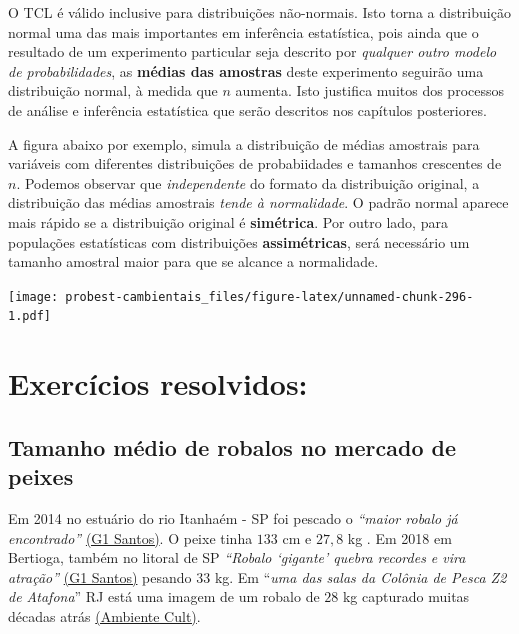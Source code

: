 \documentclass[
]{book}
\begin{document}
O TCL é válido inclusive para distribuições não-normais. Isto torna a distribuição normal uma das mais importantes em inferência estatística, pois ainda que o resultado de um experimento particular seja descrito por \emph{qualquer outro modelo de probabilidades}, as \textbf{médias das amostras} deste experimento seguirão uma distribuição normal, à medida que \(n\) aumenta. Isto justifica muitos dos processos de análise e inferência estatística que serão descritos nos capítulos posteriores.

A figura abaixo por exemplo, simula a distribuição de médias amostrais para variáveis com diferentes distribuições de probabiidades e tamanhos crescentes de \(n\). Podemos observar que \emph{independente} do formato da distribuição original, a distribuição das médias amostrais \emph{tende à normalidade}. O padrão normal aparece mais rápido se a distribuição original é \textbf{simétrica}. Por outro lado, para populações estatísticas com distribuições \textbf{assimétricas}, será necessário um tamanho amostral maior para que se alcance a normalidade.

\texttt{[image: probest-cambientais\_files/figure-latex/unnamed-chunk-296-1.pdf]}

\hypertarget{exercuxedcios-resolvidos-1}{%
\section{Exercícios resolvidos:}\label{exercuxedcios-resolvidos-1}}

\hypertarget{tamanho-muxe9dio-de-robalos-no-mercado-de-peixes}{%
\subsection{Tamanho médio de robalos no mercado de peixes}\label{tamanho-muxe9dio-de-robalos-no-mercado-de-peixes}}

Em 2014 no estuário do rio Itanhaém - SP foi pescado o \emph{``maior robalo já encontrado''} \href{http://g1.globo.com/sp/santos-regiao/noticia/2014/11/pescador-fisga-em-itanhaem-o-maior-robalo-ja-encontrado-briguei-com-ele.html}{(G1 Santos)}. O peixe tinha \(133\) cm e \(27,8\) kg . Em 2018 em Bertioga, também no litoral de SP \emph{``Robalo `gigante' quebra recordes e vira atração''} \href{https://g1.globo.com/sp/santos-regiao/noticia/robalo-gigante-quebra-recordes-e-vira-atracao-durante-pescaria-em-sp.ghtml}{(G1 Santos)} pesando \(33\) kg. Em ``\emph{uma das salas da Colônia de Pesca Z2 de Atafona}'' RJ está uma imagem de um robalo de \(28\) kg capturado muitas décadas atrás \href{http://ambientecult.blogspot.com/2010/10/ponto-de-memoria-foto-da-pesca.html}{(Ambiente Cult)}.
\end{document}
